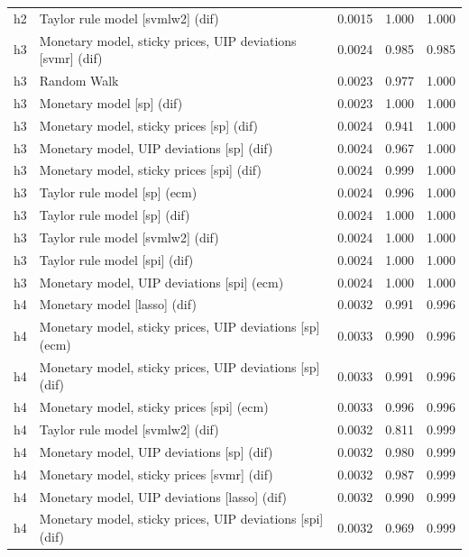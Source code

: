 \begin{ThreePartTable}
\begin{longtable}[t]{cp{5.5cm}ccc}
h2 & \raggedright Taylor rule model [svmlw2] (dif) & 0.0015 & 1.000 & 1.000\\
\addlinespace
h3 & \raggedright Monetary model, sticky prices, UIP deviations [svmr] (dif) & 0.0024 & 0.985 & 0.985\\
h3 & \raggedright Random Walk & 0.0023 & 0.977 & 1.000\\
h3 & \raggedright Monetary model [sp] (dif) & 0.0023 & 1.000 & 1.000\\
h3 & \raggedright Monetary model, sticky prices [sp] (dif) & 0.0024 & 0.941 & 1.000\\
h3 & \raggedright Monetary model, UIP deviations [sp] (dif) & 0.0024 & 0.967 & 1.000\\
h3 & \raggedright Monetary model, sticky prices [spi] (dif) & 0.0024 & 0.999 & 1.000\\
h3 & \raggedright Taylor rule model [sp] (ecm) & 0.0024 & 0.996 & 1.000\\
h3 & \raggedright Taylor rule model [sp] (dif) & 0.0024 & 1.000 & 1.000\\
h3 & \raggedright Taylor rule model [svmlw2] (dif) & 0.0024 & 1.000 & 1.000\\
h3 & \raggedright Taylor rule model [spi] (dif) & 0.0024 & 1.000 & 1.000\\
h3 & \raggedright Monetary model, UIP deviations [spi] (ecm) & 0.0024 & 1.000 & 1.000\\
\addlinespace
h4 & \raggedright Monetary model [lasso] (dif) & 0.0032 & 0.991 & 0.996\\
h4 & \raggedright Monetary model, sticky prices, UIP deviations [sp] (ecm) & 0.0033 & 0.990 & 0.996\\
h4 & \raggedright Monetary model, sticky prices, UIP deviations [sp] (dif) & 0.0033 & 0.991 & 0.996\\
h4 & \raggedright Monetary model, sticky prices [spi] (ecm) & 0.0033 & 0.996 & 0.996\\
h4 & \raggedright Taylor rule model [svmlw2] (dif) & 0.0032 & 0.811 & 0.999\\
h4 & \raggedright Monetary model, UIP deviations [sp] (dif) & 0.0032 & 0.980 & 0.999\\
h4 & \raggedright Monetary model, sticky prices [svmr] (dif) & 0.0032 & 0.987 & 0.999\\
h4 & \raggedright Monetary model, UIP deviations [lasso] (dif) & 0.0032 & 0.990 & 0.999\\
h4 & \raggedright Monetary model, sticky prices, UIP deviations [spi] (dif) & 0.0032 & 0.969 & 0.999\\

\end{longtable}
\end{ThreePartTable}
